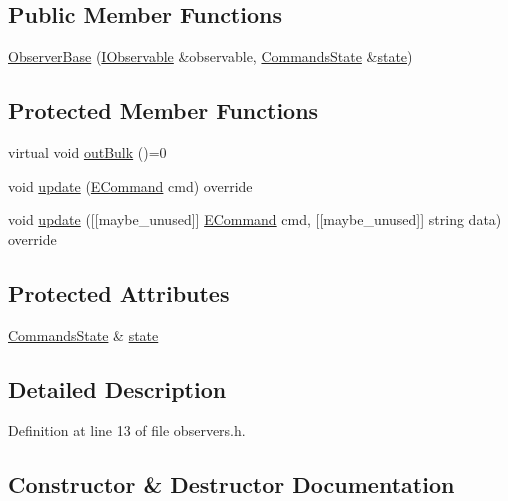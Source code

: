 \subsection*{Public Member Functions}
\begin{DoxyCompactItemize}
\item 
\hyperlink{struct_observer_base_ade5a5f743b630b7a3a06c097e7f48aa8}{Observer\+Base} (\hyperlink{struct_i_observable}{I\+Observable} \&observable, \hyperlink{class_commands_state}{Commands\+State} \&\hyperlink{struct_observer_base_a107ad54040309605fa5fafd481b97f2f}{state})
\end{DoxyCompactItemize}
\subsection*{Protected Member Functions}
\begin{DoxyCompactItemize}
\item 
virtual void \hyperlink{struct_observer_base_acf405ad8b991810572d0c2425f782b36}{out\+Bulk} ()=0
\item 
void \hyperlink{struct_observer_base_ae178c765ecda0166fd784dcb4ebe0a40}{update} (\hyperlink{interface_8h_aa299181f275f76f11365a410f7429098}{E\+Command} cmd) override
\item 
void \hyperlink{struct_observer_base_affde8239fde79ba5135dad1db3e6fcfe}{update} (\mbox{[}\mbox{[}maybe\+\_\+unused\mbox{]}\mbox{]} \hyperlink{interface_8h_aa299181f275f76f11365a410f7429098}{E\+Command} cmd, \mbox{[}\mbox{[}maybe\+\_\+unused\mbox{]}\mbox{]} string data) override
\end{DoxyCompactItemize}
\subsection*{Protected Attributes}
\begin{DoxyCompactItemize}
\item 
\hyperlink{class_commands_state}{Commands\+State} \& \hyperlink{struct_observer_base_a107ad54040309605fa5fafd481b97f2f}{state}
\end{DoxyCompactItemize}


\subsection{Detailed Description}


Definition at line 13 of file observers.\+h.



\subsection{Constructor \& Destructor Documentation}
